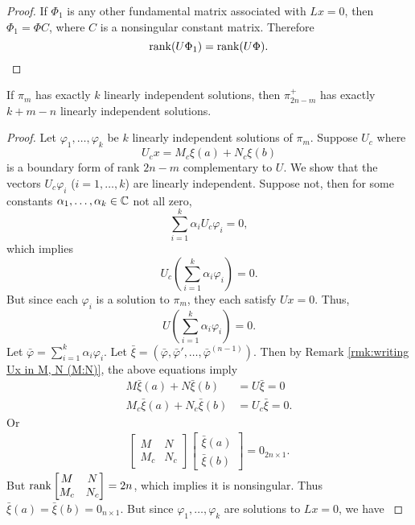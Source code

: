 \documentclass[10.5pt, oneside, a4paper]{article}
\begin{document}
\begin{proof}
    If $\Phi_1$ is any other fundamental matrix associated with $Lx=0$, then $\Phi_1=\Phi C$, where $C$ is a nonsingular constant matrix. Therefore
    \[\operatorname{rank}(U\Phi_1)=\operatorname{rank}(U\Phi).\]
\end{proof}

\begin{thm}\label{thm:exactly k l.i.d solutions implies exactly k+m-n l.i.d solutions}
    If $\pi_m$ has exactly $k$ linearly independent solutions, then $\pi_{2n-m}^+$ has exactly $k+m-n$ linearly independent solutions.
\end{thm}
\begin{proof}
    Let $\varphi_1,\ldots,\varphi_k$ be $k$ linearly independent solutions of $\pi_m$. Suppose $U_c$ where
    \[U_c x = M_c\xi(a) + N_c\xi(b)\]
    is a boundary form of rank $2n-m$ complementary to $U$. We show that the vectors $U_c \varphi_i$ ($i=1,\ldots,k$) are linearly independent. Suppose not, then for some constants $\alpha_1,\ldots,\alpha_k\in\mathbb C$ not all zero,
    \[\sum_{i=1}^k \alpha_i U_c\varphi_i=0,\]
    which implies
    \[U_c\left(\sum_{i=1}^k \alpha_i\varphi_i\right)=0.\]
    {\color{blue}But since each $\varphi_i$ is a solution to $\pi_m$, they each satisfy $Ux=0$. Thus,
    \[U\left(\sum_{i=1}^k \alpha_i\varphi_i\right)=0.\]
    Let $\bar{\varphi}=\sum_{i=1}^k \alpha_i\varphi_i$. Let $\bar{\xi}=(\bar{\varphi}, \bar{\varphi}', \ldots, \bar{\varphi}^{(n-1)})$. Then by Remark \ref{rmk:writing Ux in M, N (M:N)}, the above equations imply
    \begin{align*}
        M\bar{\xi}(a) + N\bar{\xi}(b) &= U\bar{\xi}=0\\
        M_c\bar{\xi}(a) + N_c\bar{\xi}(b) &= U_c\bar{\xi}=0.
    \end{align*}
    Or
    \begin{align*}
        \begin{bmatrix}
            M & N\\
            M_c & N_c
        \end{bmatrix}
        \begin{bmatrix}
            \bar{\xi}(a)\\
            \bar{\xi}(b)
        \end{bmatrix} =
        0_{2n\times 1}.
    \end{align*}
    But $\operatorname{rank}\begin{bmatrix}
        M & N\\
        M_c & N_c
    \end{bmatrix}=2n$, which implies it is nonsingular. Thus $\bar{\xi}(a) = \bar{\xi}(b)=0_{n\times 1}$. But since $\varphi_1,\ldots, \varphi_k$ are solutions to $Lx=0$, we have
}
\end{proof}
\end{document}
